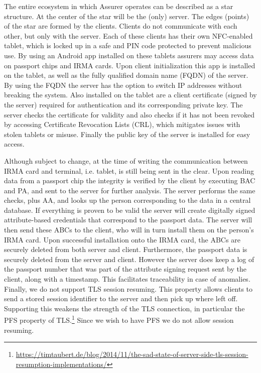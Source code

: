 The entire ecosystem in which Assurer operates can be described as a star structure. At the center of the star will be the (only) server. The edges (points) of the star are formed by the clients. Clients do not communicate with each other, but only with the server. Each of these clients has their own NFC-enabled tablet, which is locked up in a safe and PIN code protected to prevent malicious use. By using an Android app installed on these tablets assurers may access data on passport chips and IRMA cards. Upon client initialization this app is installed on the tablet, as well as the fully qualified domain name (FQDN) of the server. By using the FQDN the server has the option to switch IP addresses without breaking the system. Also installed on the tablet are a client certificate (signed by the server) required for authentication and its corresponding private key. The server checks the certificate for validity and also checks if it has not been revoked by accessing Certificate Revocation Lists (CRL), which mitigates issues with stolen tablets or misuse. Finally the public key of the server is installed for easy access.

Although subject to change, at the time of writing the communication between IRMA card and terminal, i.e. tablet, is still being sent in the clear. Upon reading data from a passport chip the integrity is verified by the client by executing BAC and PA, and sent to the server for further analysis. The server performs the same checks, plus AA, and looks up the person corresponding to the data in a central database. If everything is proven to be valid the server will create digitally signed attribute-based credentials that correspond to the passport data. The server will then send these ABCs to the client, who will in turn install them on the person's IRMA card. Upon successful installation onto the IRMA card, the ABCs are securely deleted from both server and client. Furthermore, the passport data is securely deleted from the server and client. However the server does keep a log of the passport number that was part of the attribute signing request sent by the client, along with a timestamp. This facilitates traceability in case of anomalies. Finally, we do not support TLS session resuming. This property allows clients to send a stored session identifier to the server and then pick up where left off. Supporting this weakens the strength of the TLS connection, in particular the PFS property of TLS.\footnote{\url{https://timtaubert.de/blog/2014/11/the-sad-state-of-server-side-tls-session-resumption-implementations/}} Since we wish to have PFS we do not allow session resuming.

